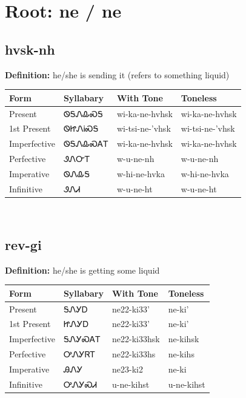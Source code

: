 \documentclass{article}%
\begin{document}
%
\normalsize%
\section*{Root: ne / ne}%
\subsection*{hvsk-nh}%
\textbf{Definition: }%
he/she is sending it (refers to something liquid)%
\\[0.5em]%
\begin{tabular}{|l|l|l|l|}%
\hline%
\textbf{Form}&\textbf{Syllabary}&\textbf{With Tone}&\textbf{Toneless}\\%
\hline%
Present&ᏫᎦᏁᎲᏍᎦ&wi{-}ka{-}ne{-}hvhsk&wi{-}ka{-}ne{-}hvhsk\\%
1st Present&ᏫᏥᏁᎥᏍᎦ&wi{-}tsi{-}ne{-}'vhsk&wi{-}tsi{-}ne{-}'vhsk\\%
Imperfective&ᏫᎦᏁᎲᏍᎪᎢ&wi{-}ka{-}ne{-}hvhsk&wi{-}ka{-}ne{-}hvhsk\\%
Perfective&ᏭᏁᏅᎢ&w{-}u{-}ne{-}nh&w{-}u{-}ne{-}nh\\%
Imperative&ᏫᏁᎲᎦ&w{-}hi{-}ne{-}hvka&w{-}hi{-}ne{-}hvka\\%
Infinitive&ᏭᏁᏗ&w{-}u{-}ne{-}ht&w{-}u{-}ne{-}ht\\%
\hline%
\end{tabular}%
\\[1em]%
\subsection*{rev-gi}%
\textbf{Definition: }%
he/she is getting some liquid%
\\[0.5em]%
\begin{tabular}{|l|l|l|l|}%
\hline%
\textbf{Form}&\textbf{Syllabary}&\textbf{With Tone}&\textbf{Toneless}\\%
\hline%
Present&ᎦᏁᎩᎠ&ne22{-}ki33'&ne{-}ki'\\%
1st Present&ᏥᏁᎩᎠ&ne22{-}ki33'&ne{-}ki'\\%
Imperfective&ᎦᏁᎩᏍᎪᎢ&ne22{-}ki33hsk&ne{-}kihsk\\%
Perfective&ᎤᏁᎩᏒᎢ&ne22{-}ki33hs&ne{-}kihs\\%
Imperative&ᎯᏁᎩ&ne23{-}ki2&ne{-}ki\\%
Infinitive&ᎤᏁᎩᏍᏗ&u{-}ne{-}kihst&u{-}ne{-}kihst\\%
\hline%
\end{tabular}%
\\[1em]%
\end{document}
